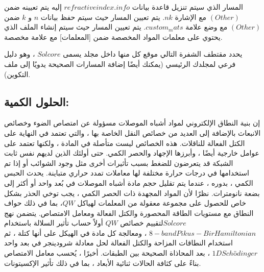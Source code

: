 المسار الذي سيتم تنزيل قاعدة بيانات $ refractiveindex.info $ إليه يتم تعيينه ضمن $ (Other) $ مع الإشارة $ nk $.
يتم تعيين المسار حيث سيتم حفظ بيانات $ n $ و $ k $ ضمن $ (Other) $ مع وضع علامة $ custom_mats $.
يتم تعيين المسار حيث سيتم إنشاء الملف الذي يحتوي على معلمات المواد المخصصة ضمن [المعلمات] مع علامة مخصصة.

يحدد مقتطف الشفرة التالي موقع كل منها داخل مجلد يسمى $ Solcore $ ، وهو دليل فرعي لمجلدك الرئيسي (يمكنك أيضًا إضافة المسارات الصحيحة يدويًا إلى ملف التكوين).


\subsection{الحلول الكمية:}
إن بنية النطاق الإلكتروني لمواد أشباه الموصلات مسؤولة عن امتصاص الضوء وخصائص الانبعاث بالإضافة إلى العديد من خصائص النقل الخاصة بها ، والتي تعتمد في النهاية على الكتل الفعالة للناقلات. هذه الخصائص ليست متأصلة في المادة ، ولكنها تعتمد على عوامل خارجية أيضًا ، وأبرزها الإجهاد والحصر الكمي. حتى أولئك الذين لديهم نفس ثابت الشبكة قد يتعرضون للضغط بسبب تأثيرات أخرى مثل وجود الشوائب أو إذا تم استخدامها في درجات حرارة مختلفة لها معاملات تمدد حراري متباينة. يحدث الحبس الكمي ، بدوره ، عندما يتم تقليل حجم مادة أشباه الموصلات في بُعد واحد أو أكثر إلى بضعة نانومترات. نظرًا لأن المواد المجهدة ذات الحصر الكمي ، يجب توخي الحذر بشكل خاص للحصول على مجموعة معقولة من المعلمات لهياكل $ QW  $، بما في ذلك حواف النطاق مع مستويات الطاقة المحصورة والكتل الفعالة ومعامل الامتصاص.
يتضمن نهج $ Solcore  $لتقييم خصائص $ QW $ أولاً حساب تأثير السلالة باستخدام $ 8-band Pikus-Bir Hamiltonian $ ، ومعالجة كل مادة في الهيكل على أنها كتلة ، ثم استخدام النطاقات المزاحة والكتل الفعالة لحل معادلة شرودينجر في بعد واحد  $ 1D Schödinger $ ، بعد المحاذاة الصحيحة بين الطبقات. أخيرًا ، يُحسب معامل الامتصاص بناءً على كثافة الحالات ثنائية الأبعاد ، بما في ذلك تأثير الإكسيتونات.

